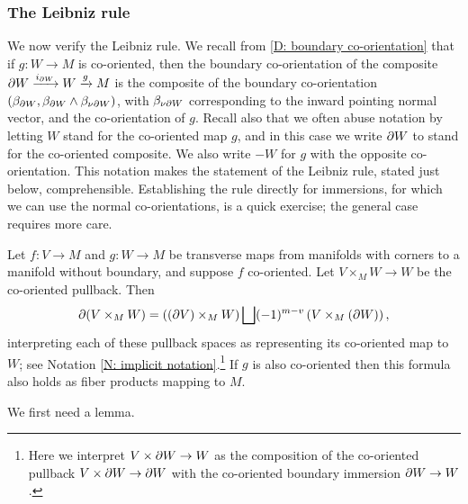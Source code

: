 \subsubsection{The Leibniz rule}

We now verify the Leibniz rule.
We recall from \cref{D: boundary co-orientation} that if $g \colon W \to M$ is co-oriented, then the boundary co-orientation of the composite $\partial W \xrightarrow{i_{\partial W}} W \xrightarrow{g} M$ is the composite of the boundary co-orientation $(\beta_{\partial W}, \beta_{\partial W} \wedge \beta_{\nu \partial W})$, with $\beta_{\nu \partial W}$ corresponding to the inward pointing normal vector, and the co-orientation of $g$.
Recall also that we often abuse notation by letting $W$ stand for the co-oriented map $g$, and in this case we write $\partial W$ to stand for the co-oriented composite.
We also write $-W$ for $g$ with the opposite co-orientation.
This notation makes the statement of the Leibniz rule, stated just below, comprehensible.
Establishing the rule directly for immersions, for which we can use the normal co-orientations, is a quick exercise; the general case requires more care.


\begin{proposition}\label{leibniz}
	Let $f \colon V \to M$ and $g \colon W \to M$ be transverse maps from manifolds with corners to a manifold without boundary, and suppose $f$ co-oriented.
	Let $V \times_M W \to W$ be the co-oriented pullback.
	Then
	$$\partial (V \times_M W) = \left((\partial V) \times_M W\right) \bigsqcup (-1)^{m-v} \left(V \times_M (\partial W)\right),$$
	interpreting each of these pullback spaces as representing its co-oriented map to $W$; see Notation \ref{N: implicit notation}.\footnote{Here we interpret $V \times \partial W \to W$ as the composition of the co-oriented pullback $V \times \partial W \to \partial W$ with the co-oriented boundary immersion $\partial W \to W$.} If $g$ is also co-oriented then this formula also holds as fiber products mapping to $M$.
\end{proposition}


We first need a lemma.

